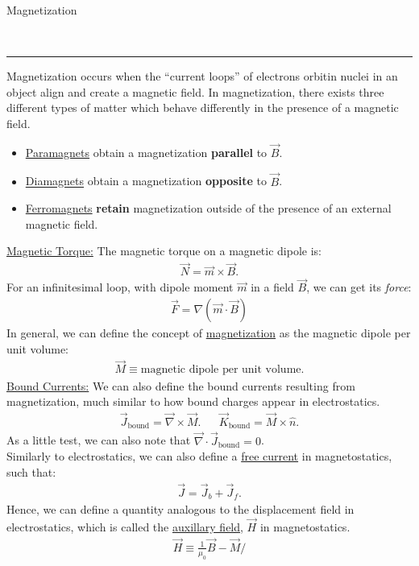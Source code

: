 \documentclass{article}
\newcommand{\header}[1]{\begin{large}\noindent #1\end{large}\\\rule{\textwidth}{0.5pt}}
\newcommand{\gap}{\medskip\\}
\newcommand{\sheader}[1]{\underline{#1:}}
\begin{document}
\header{Magnetization}
Magnetization occurs when the ``current loops'' of electrons orbitin nuclei in an object
align and create a magnetic field. In magnetization, there exists three different types of 
matter which behave differently in the presence of a magnetic field.
\begin{itemize}
    \item \underline{Paramagnets} obtain a magnetization \textbf{parallel} to $\vec{B}$.
    \item \underline{Diamagnets} obtain a magnetization \textbf{opposite} to $\vec{B}$.
    \item \underline{Ferromagnets} \textbf{retain} magnetization outside of the presence 
    of an external magnetic field.
\end{itemize}
\sheader{Magnetic Torque} The magnetic torque on a magnetic dipole is:
\begin{align*}
    \vec{N} = \vec{m} \times \vec{B}.
\end{align*}
For an infinitesimal loop, with dipole moment $\vec{m}$ in a field $\vec{B}$, we can get 
its \textit{force}:
\begin{align*}
    \vec{F} = \nabla(\vec{m} \cdot \vec{B})
\end{align*}
In general, we can define the concept of \underline{magnetization} as the magnetic dipole 
per unit volume:
\begin{align*}
    \vec{M} \equiv \textrm{magnetic dipole per unit volume.}
\end{align*}
\sheader{Bound Currents} We can also define the bound currents resulting from magnetization, 
much similar to how bound charges appear in electrostatics.
\begin{align*}
    \vec{J}_\textrm{bound} = \vec{\nabla} \times \vec{M}. && \vec{K}_\textrm{bound} = \vec{M} \times \hat{n}.
\end{align*}
As a little test, we can also note that $\vec{\nabla} \cdot \vec{J}_\textrm{bound} = 0$.
\gap
Similarly to electrostatics, we can also define a \underline{free current} in magnetostatics,
such that:
\begin{align*}
    \vec{J} = \vec{J}_b + \vec{J}_f.
\end{align*}
Hence, we can define a quantity analogous to the displacement field in electrostatics, 
which is called the \underline{auxillary field}, $\vec{H}$ in magnetostatics.
\begin{align*}
    \vec{H} \equiv \frac{1}{\mu_0}\vec{B} - \vec{M}/
\end{align*}
\end{document}
